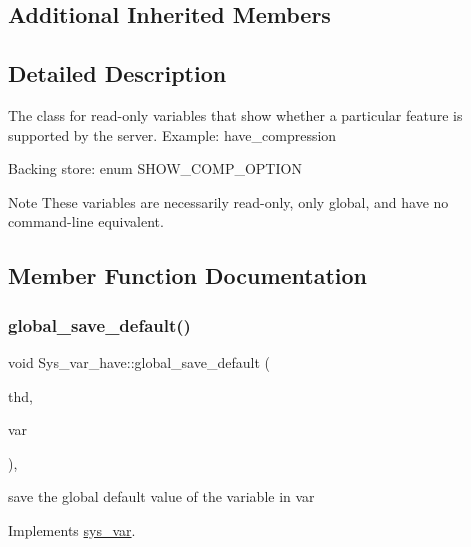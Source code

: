 \subsection*{Additional Inherited Members}


\subsection{Detailed Description}
The class for read-\/only variables that show whether a particular feature is supported by the server. Example\+: have\+\_\+compression

Backing store\+: enum S\+H\+O\+W\+\_\+\+C\+O\+M\+P\+\_\+\+O\+P\+T\+I\+ON

\begin{DoxyNote}{Note}
These variables are necessarily read-\/only, only global, and have no command-\/line equivalent. 
\end{DoxyNote}


\subsection{Member Function Documentation}
\mbox{\label{classSys__var__have_aeaccee0596984bf2f934b7b57a8e2bd1}} 
\subsubsection{\texorpdfstring{global\+\_\+save\+\_\+default()}{global\_save\_default()}}
{\footnotesize\ttfamily void Sys\+\_\+var\+\_\+have\+::global\+\_\+save\+\_\+default (\begin{DoxyParamCaption}\item[{T\+HD $\ast$}]{thd,  }\item[{\mbox{\hyperlink{classset__var}{set\+\_\+var}} $\ast$}]{var }\end{DoxyParamCaption})\hspace{0.3cm}{\ttfamily [inline]}, {\ttfamily [virtual]}}

save the global default value of the variable in var 

Implements \mbox{\hyperlink{classsys__var}{sys\+\_\+var}}.

\mbox{\label{classSys__var__have_a9440d30a06f06a6b5dd8ca3aa436ce94}} 
